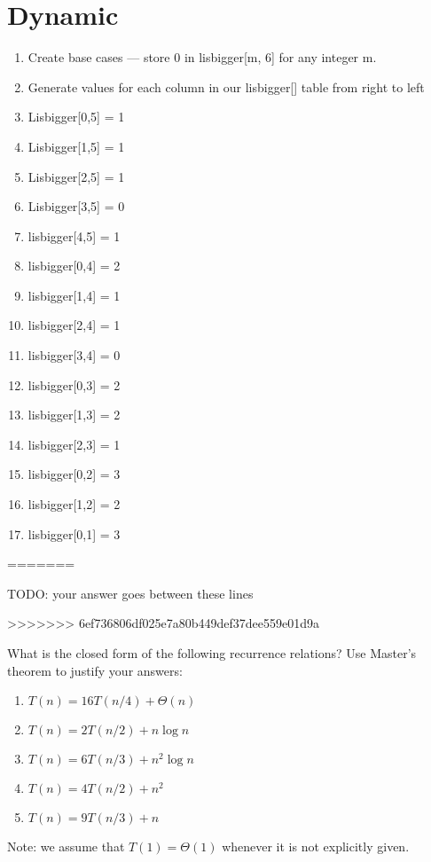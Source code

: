 \documentclass{article}
\begin{document}
\section{Dynamic}

\begin{enumerate}
	\item Create base cases --- store 0 in lisbigger[m, 6] for any integer m. 
	\item Generate values for each column in our lisbigger[] table from right to left
	\item Lisbigger[0,5] = 1
	\item Lisbigger[1,5] = 1
	\item Lisbigger[2,5] = 1
	\item Lisbigger[3,5] = 0
	\item lisbigger[4,5] = 1
	\item lisbigger[0,4] = 2
	\item lisbigger[1,4] = 1
	\item lisbigger[2,4] = 1
	\item lisbigger[3,4] = 0
	\item lisbigger[0,3] = 2
	\item lisbigger[1,3] = 2
	\item lisbigger[2,3] = 1
	\item lisbigger[0,2] = 3
	\item lisbigger[1,2] = 2
	\item lisbigger[0,1] = 3
\end{enumerate}



\nextprob
{}
=======


TODO: your answer goes between these lines


\nextprob
{}
>>>>>>> 6ef736806df025e7a80b449def37dee559e01d9a

What is the closed form of the following recurrence relations?  Use Master's
theorem to justify your answers:
\begin{enumerate}
    \item $T(n) = 16 T(n/4) + \Theta(n)$
    \item $T(n) = 2 T(n/2) + n \log{n}$
    \item $T(n) = 6 T(n/3) + n^2 \log{n}$
    \item $T(n) = 4 T(n/2) + n^2$
    \item $T(n) = 9 T(n/3) + n$
\end{enumerate}
Note: we assume that $T(1)=\Theta(1)$ whenever it is not explicitly given.
\end{document}
